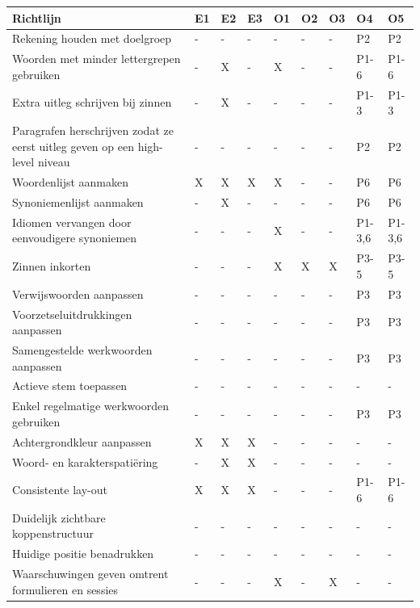 \begin{table}[H]
	\centering
	\begin{tabular}{ | m{8cm} | m{0.5cm} | m{0.5cm} | m{0.5cm} | m{0.5cm} | m{0.5cm} | m{0.5cm} | m{1cm} | m{1cm} | }
		\hline
		\textbf{Richtlijn} & \textbf{E1} & \textbf{E2} & \textbf{E3} & \textbf{O1} & \textbf{O2} & \textbf{O3} & \textbf{O4} & \textbf{O5} \\ \hline
		Rekening houden met doelgroep & - & - & - & - & - & - & P2 & P2 \\ \hline
		Woorden met minder lettergrepen gebruiken & - & X & - & X & - & - & P1-6 & P1-6 \\ \hline
		Extra uitleg schrijven bij zinnen & - & X & - & - & - & - & P1-3 & P1-3 \\ \hline
		Paragrafen herschrijven zodat ze eerst uitleg geven op een high-level niveau & - & - & - & - & - & - & P2 & P2 \\ \hline
		Woordenlijst aanmaken & X & X & X & X & - & - & P6 & P6 \\ \hline
		Synoniemenlijst aanmaken & - & X & - & - & - & - & P6 & P6 \\ \hline
		Idiomen vervangen door eenvoudigere synoniemen & - & - & - & X & - & - & P1-3,6 & P1-3,6 \\ \hline
		Zinnen inkorten & - & - & - & X & X & X & P3-5 & P3-5 \\ \hline
		Verwijswoorden aanpassen & - & - & - & - & - & - & P3 & P3 \\ \hline
		Voorzetseluitdrukkingen aanpassen & - & - & - & - & - & - & P3 & P3 \\ \hline
		Samengestelde werkwoorden aanpassen & - & - & - & - & - & - & P3 & P3 \\ \hline
		Actieve stem toepassen & - & - & - & - & - & - & - & - \\ \hline
		Enkel regelmatige werkwoorden gebruiken & - & - & - & - & - & - & P3 & P3 \\ \hline
		Achtergrondkleur aanpassen & X & X & X & - & - & - & - & - \\ \hline
		Woord- en karakterspatiëring & - & X & X & - & - & - & - & - \\ \hline
		Consistente lay-out & X & X & X & - & - & - & P1-6 & P1-6 \\ \hline
		Duidelijk zichtbare koppenstructuur & - & - & - & - & - & - & - & - \\ \hline
		Huidige positie benadrukken & - & - & - & - & - & - & - & - \\ \hline
		Waarschuwingen geven omtrent formulieren en sessies & - & - & - & X & - & X & - & - \\ \hline

\end{tabular}
\end{table}
